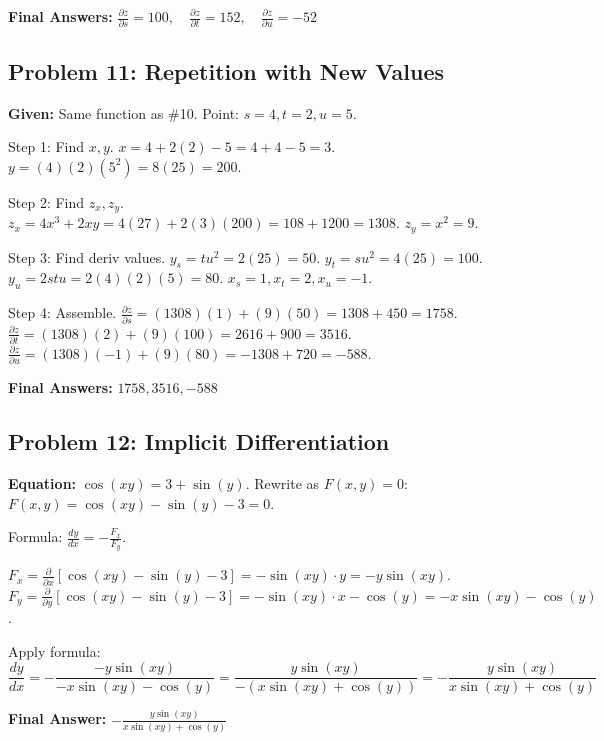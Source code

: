 \documentclass[11pt, letterpaper]{article}
\theoremstyle{definition}
\begin{document}
\textbf{Final Answers:}
$\frac{\partial z}{\partial s} = \boxed{100}, \quad \frac{\partial z}{\partial t} = \boxed{152}, \quad \frac{\partial z}{\partial u} = \boxed{-52}$


\subsection*{Problem 11: Repetition with New Values}
\textbf{Given:} Same function as \#10.
Point: $s=4, t=2, u=5$.

Step 1: Find $x, y$.
$x = 4 + 2(2) - 5 = 4 + 4 - 5 = 3$.
$y = (4)(2)(5^2) = 8(25) = 200$.

Step 2: Find $z_x, z_y$.
$z_x = 4x^3 + 2xy = 4(27) + 2(3)(200) = 108 + 1200 = 1308$.
$z_y = x^2 = 9$.

Step 3: Find deriv values.
$y_s = tu^2 = 2(25) = 50$.
$y_t = su^2 = 4(25) = 100$.
$y_u = 2stu = 2(4)(2)(5) = 80$.
$x_s=1, x_t=2, x_u=-1$.

Step 4: Assemble.
$\frac{\partial z}{\partial s} = (1308)(1) + (9)(50) = 1308 + 450 = 1758$.
$\frac{\partial z}{\partial t} = (1308)(2) + (9)(100) = 2616 + 900 = 3516$.
$\frac{\partial z}{\partial u} = (1308)(-1) + (9)(80) = -1308 + 720 = -588$.

\textbf{Final Answers:} $\boxed{1758}, \boxed{3516}, \boxed{-588}$


\subsection*{Problem 12: Implicit Differentiation}
\textbf{Equation:} $\cos(xy) = 3 + \sin(y)$.
Rewrite as $F(x,y) = 0$:
$F(x,y) = \cos(xy) - \sin(y) - 3 = 0$.

Formula: $\frac{dy}{dx} = -\frac{F_x}{F_y}$.

$F_x = \frac{\partial}{\partial x}[\cos(xy) - \sin(y) - 3] = -\sin(xy) \cdot y = -y\sin(xy)$.
$F_y = \frac{\partial}{\partial y}[\cos(xy) - \sin(y) - 3] = -\sin(xy) \cdot x - \cos(y) = -x\sin(xy) - \cos(y)$.

Apply formula:
\[ \frac{dy}{dx} = -\frac{-y\sin(xy)}{-x\sin(xy) - \cos(y)} = \frac{y\sin(xy)}{-(x\sin(xy) + \cos(y))} = -\frac{y\sin(xy)}{x\sin(xy) + \cos(y)} \]

\textbf{Final Answer:} $\boxed{-\frac{y\sin(xy)}{x\sin(xy) + \cos(y)}}$

\end{document}
